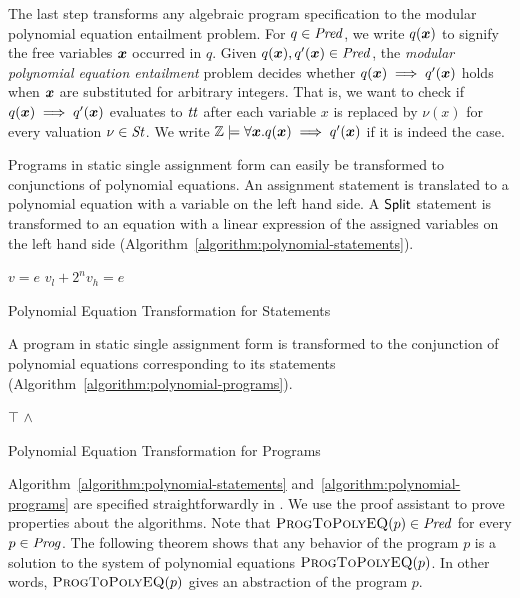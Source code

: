 
The last step transforms any algebraic program specification to the 
modular polynomial equation entailment problem. For
$q \in \mathit{Pred}$, we write $q(\vx)$ to signify the free variables $\vx$
occurred in $q$. Given $q(\vx), q'(\vx) \in \Pred$, the \emph{modular
  polynomial equation entailment} problem decides whether 
$q(\vx) \implies q'(\vx)$ holds when $\vx$ are substituted for
arbitrary integers. That is, we want to check if $q(\vx) \implies
q'(\vx)$ evaluates to $\mathit{tt}$ after each variable $x$ is replaced by
$\nu(x)$ for every valuation $\nu \in \mathit{St}$. We write $\bbfZ \models
\forall \vx. q(\vx) \implies q'(\vx)$ if it is indeed the case.

Programs in static single assignment form can easily be transformed to
conjunctions of polynomial equations. An assignment statement is
translated to a polynomial equation with a variable on the left hand side.
A $\mbox{\textsf{Split}}$ statement is transformed to an
equation with a linear expression of the assigned variables on the
left hand side (Algorithm~\ref{algorithm:polynomial-statements}). 
\begin{algorithm}
  \begin{algorithmic}[1]
        \Return $v = e$
      \EndCase
        \Return $v_l + 2^n v_h = e$
      \EndCase
    \EndMatch
    \EndFunction
  \end{algorithmic}
  \caption{Polynomial Equation Transformation for Statements}
  \label{algorithm:polynomial-statements}
\end{algorithm}

A program in static single assignment form is transformed to the
conjunction of polynomial equations corresponding to its statements
(Algorithm~\ref{algorithm:polynomial-programs}). 

\begin{algorithm}
  \begin{algorithmic}[1]
      \Case{$\epsilon$} \Return $\top$ \EndCase
        \Return {} $\wedge$
      \EndCase
    \EndMatch
    \EndFunction
  \end{algorithmic}
  \caption{Polynomial Equation Transformation for Programs}
  \label{algorithm:polynomial-programs}
\end{algorithm}

Algorithm~\ref{algorithm:polynomial-statements}
and~\ref{algorithm:polynomial-programs} are specified straightforwardly 
in \gallina. We use the proof assistant \coq to prove properties
about the algorithms. Note that $\textsc{ProgToPolyEQ}(p) \in
\mathit{Pred}$ for every $p \in \mathit{Prog}$. The following theorem shows that any
behavior of the program $p$ is a solution to the system of polynomial
equations $\textsc{ProgToPolyEQ}(p)$. In other words,
$\textsc{ProgToPolyEQ}(p)$ gives an abstraction of the program $p$.

